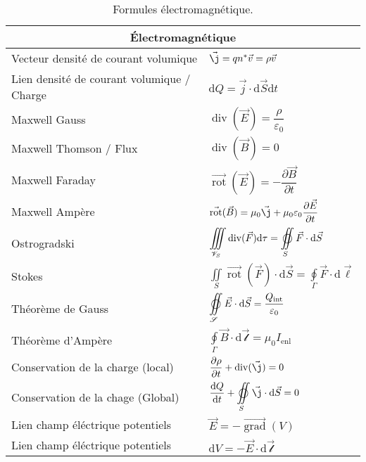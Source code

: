 \documentclass[10pt,a4paper,titlepage,landscape]{article}
\renewcommand{\d}
{
    \mathrm{d}
}
\newcommand*{\dv}[2]
{
    \dfrac{\d#1}{\d#2}
}
\newcommand*{\dpv}[2]
{
    \dfrac{\partial#1}{\partial#2}
}
\newcommand{\rot}
{
    \vec{\operatorname{rot}}
}
\renewcommand{\div}
{
    \operatorname{div}
}
\newcommand{\grad}
{
    \vec{\operatorname{grad}}
}
\renewcommand{\arraystretch}{2}
\begin{document}
\begin{table}[H]
    \centering
    \renewcommand{\arraystretch}{1.5} %
    \setlength{\tabcolsep}{8pt} %
    \begin{tabular}{@{}|p{9cm}|p{10cm}@{}|}

        \multicolumn{2}{c}{\textbf{Électromagnétique}} \\ \hline

    Vecteur densité de courant volumique & $\vec{\j} = qn^{*}\vec{v} = \rho \vec{v}$ \\ \hline 
    Lien densité de courant volumique / Charge & $\text{d}Q = \vec{j}\cdot\text{d}\vec{S}\text{d}t$ \\ \hline 
    Maxwell Gauss & $\div(\vec{E}) = \dfrac{\rho}{\varepsilon_0}$ \\ \hline 
    Maxwell Thomson / Flux & $\div(\vec{B}) = 0$ \\ \hline 
    Maxwell Faraday & $\rot(\vec{E}) = -\dpv{\vec{B}}{t}$ \\ \hline 
    Maxwell Ampère & $\rot(\vec{B}) = \mu_0\vec{\j} + \mu_0 \varepsilon_0 \dpv{\vec{E}}{t}$ \\ \hline 
    Ostrogradski & $\displaystyle \iiint\limits_{\mathscr{V}_S}\div(\vec{F})\text{d}\tau = \varoiint\limits_{S}\vec{F}\cdot\text{d}\vec{S}$ \\ \hline  
    Stokes & $\displaystyle \iint\limits_{S}\rot(\vec{F})\cdot\text{d}\vec{S}=\oint\limits_{\Gamma}\vec{F}\cdot \text{d}\vec{\ell}$ \\ \hline 
    Théorème de Gauss & $\displaystyle \varoiint\limits_{\mathscr{S}}\vec{E}\cdot\text{d}\vec{S} = \dfrac{Q_{\text{int}}}{\varepsilon_0}$ \\ \hline 
    Théorème d'Ampère & $\displaystyle \oint\limits_{\Gamma}\vec{B}\cdot\text{d}\vec{\mathscr{l}} = \mu_0 I_{\text{enl}}$ \\ \hline 
    Conservation de la charge (local) & $\dpv{\rho}{t} + \div(\vec{\j}) = 0$ \\ \hline 
    Conservation de la chage (Global) & $\displaystyle \dv{Q}{t} + \varoiint\limits_{S}\vec{\j}\cdot \text{d}\vec{S} = 0$ \\ \hline 
    Lien champ éléctrique potentiels & $\vec{E} = -\grad(V)$ \\ \hline 
    Lien champ éléctrique potentiels & $ \text{d}V = -\vec{E} \cdot \text{d}\vec{\mathscr{l}}$ \\ \hline 
    \end{tabular}
\caption{Formules électromagnétique.}
\label{tab:electromag}
\end{table}
\end{document}
